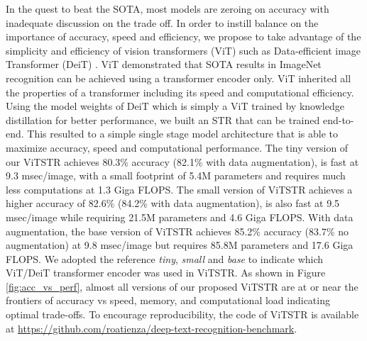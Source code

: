 \documentclass[runningheads]{llncs}
\begin{document}
In the quest to beat the SOTA, most models are zeroing on accuracy with inadequate discussion on the trade off. In order to instill balance on the importance of accuracy, speed and efficiency, we propose to take advantage of the simplicity and efficiency of vision transformers (ViT) \cite{dosovitskiy2020image} such as Data-efficient image Transformer (DeiT) \cite{touvron2020training}. ViT demonstrated that SOTA results in ImageNet \cite{russakovsky2015imagenet} recognition can be achieved using a transformer \cite{vaswani2017attention} encoder only. ViT inherited all the properties of a transformer including its speed and computational efficiency. Using the model weights of DeiT which is simply a ViT trained by knowledge distillation \cite{hinton2015distilling} for better performance, we built an STR that can be trained end-to-end. This  resulted to a simple single stage model architecture that is able to maximize accuracy, speed and computational performance. The tiny version of our ViTSTR achieves 80.3\% accuracy (82.1\% with data augmentation), is fast at 9.3 msec/image, with a small footprint of 5.4M parameters and requires much less computations at 1.3 Giga FLOPS. The small version of ViTSTR achieves a higher accuracy of 82.6\% (84.2\% with data augmentation), is also fast at 9.5 msec/image while requiring 21.5M parameters and 4.6 Giga FLOPS. With data augmentation, the base version of ViTSTR achieves 85.2\% accuracy (83.7\% no augmentation) at 9.8 msec/image but requires 85.8M parameters and 17.6 Giga FLOPS. We adopted the reference \textit{tiny}, \textit{small} and \textit{base} to indicate which ViT/DeiT transformer encoder was used in ViTSTR. As shown in Figure \ref{fig:acc_vs_perf}, almost all versions of our proposed ViTSTR are at or near the frontiers of accuracy vs speed, memory, and computational load indicating optimal trade-offs. To encourage reproducibility, the code of ViTSTR is available at \href{https://github.com/roatienza/deep-text-recognition-benchmark}{https://github.com/roatienza/deep-text-recognition-benchmark}.
\end{document}
